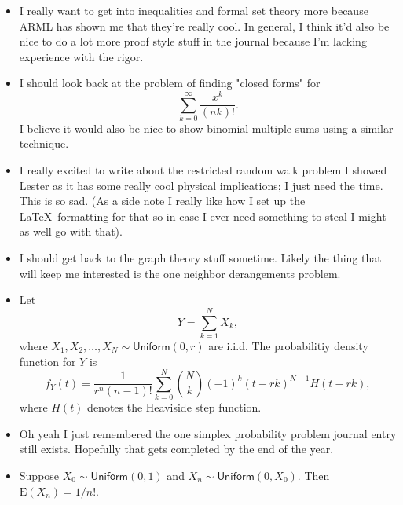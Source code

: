 \begin{itemize}
    \item I really want to get into inequalities and formal set theory more
        because ARML has shown me that they're really cool. In general, I think
        it'd also be nice to do a lot more proof style stuff in the journal
        because I'm lacking experience with the rigor.

    \item I should look back at the problem of finding "closed forms" for
        \[
            \sum_{k = 0}^{\infty} \frac{x^k}{(nk)!}
        .\]
        I believe it would also be nice to show binomial multiple sums
        using a similar technique.

    \item I really excited to write about the restricted random walk problem I
        showed Lester as it has some really cool physical implications; I just
        need the time. This is so sad. (As a side note I really like how I set
        up the \LaTeX\ formatting for that so in case I ever need something to
        steal I might as well go with that).

    \item I should get back to the graph theory stuff sometime. Likely the
        thing that will keep me interested is the one neighbor derangements
        problem.

    \item Let
        \[
            Y = \sum_{k = 1}^{N} X_k
        ,\]
        where \( X_1, X_2, \ldots, X_N \sim \textsf{Uniform}(0, r) \) are i.i.d. The probabilitiy density function for \( Y \) is
        \[
            f_Y (t) = \frac{1}{r^n (n-1)!} \sum_{k = 0}^{N} \binom{N}{k} (-1)^k (t - rk)^{N - 1} H(t - rk)
        ,\]
        where \( H(t) \) denotes the Heaviside step function.

    \item Oh yeah I just remembered the one simplex probability problem journal
        entry still exists. Hopefully that gets completed by the end of the
        year.

    \item Suppose \( X_0 \sim \textsf{Uniform} (0, 1) \) and \( X_n \sim \textsf{Uniform} (0, X_0) \). Then \( \mathrm{E} (X_n) = 1/n! \).
\end{itemize}
